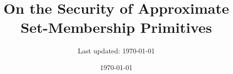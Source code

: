 %




\title{On the Security of Approximate Set-Membership Primitives}
\date{\today}
\author{Last updated: \today}

\maketitle



\begin{abstract}
\centering
%
\end{abstract}




%

%
%


